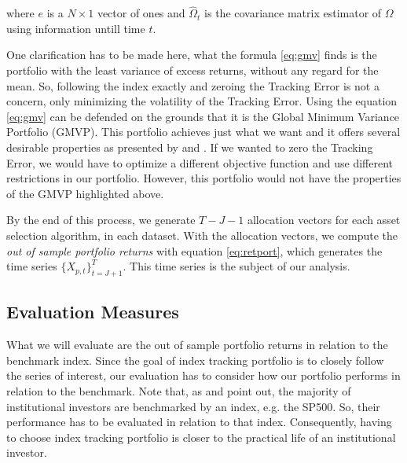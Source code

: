 \documentclass[12pt,oneside,a4paper]{memoir}
\begin{document}
\noindent
where $e$ is a $N \times 1$ vector of ones and $\hat{\Omega}_{t}$ is the covariance matrix estimator of $\Omega$ using information untill time $t$.

One clarification has to be made here, what the formula \eqref{eq:gmv} finds is the portfolio with the least variance of excess returns, without any regard for the mean.
So, following the index exactly and zeroing the Tracking Error is not a concern, only minimizing the volatility of the Tracking Error.
Using the equation \eqref{eq:gmv} can be defended on the grounds that it is the Global Minimum Variance Portfolio (GMVP).
This portfolio achieves just what we want and it offers several desirable properties as presented by  and .
If we wanted to zero the Tracking Error, we would have to optimize a different objective function and use different restrictions in our portfolio.
However, this portfolio would not have the properties of the GMVP highlighted above.

By the end of this process, we generate $T-J-1$ allocation vectors for each asset selection algorithm, in each dataset.
With the allocation vectors, we compute the \textit{out of sample portfolio returns} with equation \eqref{eq:retport}, which generates the time series $\{X_{p,t}\}_{t=J+1}^{T}$.
This time series is the subject of our analysis. 

\subsection{Evaluation Measures} %

What we will evaluate are the out of sample portfolio returns in relation to the benchmark index.
Since the goal of index tracking portfolio is to closely follow the series of interest, our evaluation has to consider how our portfolio performs in relation to the benchmark.
Note that, as  and  point out, the majority of institutional investors are benchmarked by an index, e.g. the SP500.
So, their performance has to be evaluated in relation to that index.
Consequently, having to choose index tracking portfolio is closer to the practical life of an institutional investor.


\end{document}
